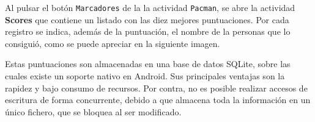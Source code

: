 Al pulsar el botón \texttt{Marcadores} de la la actividad \texttt{Pacman}, se abre la actividad \textbf{Scores} que contiene un listado con las diez mejores puntuaciones. Por cada registro se indica, además de la puntuación, el nombre de la personas que lo consiguió, como se puede apreciar en la siguiente imagen.
\newline

Estas puntuaciones son almacenadas en una base de datos SQLite, sobre las cuales existe un soporte nativo en Android. Sus principales ventajas son la rapidez y bajo consumo de recursos. Por contra, no es posible realizar accesos de escritura de forma concurrente, debido a que almacena toda la información en un único fichero, que se bloquea al ser modificado.

\begin{figure}[h!]
	\centering	
	 \hspace*{0.5cm}
\end{figure}


